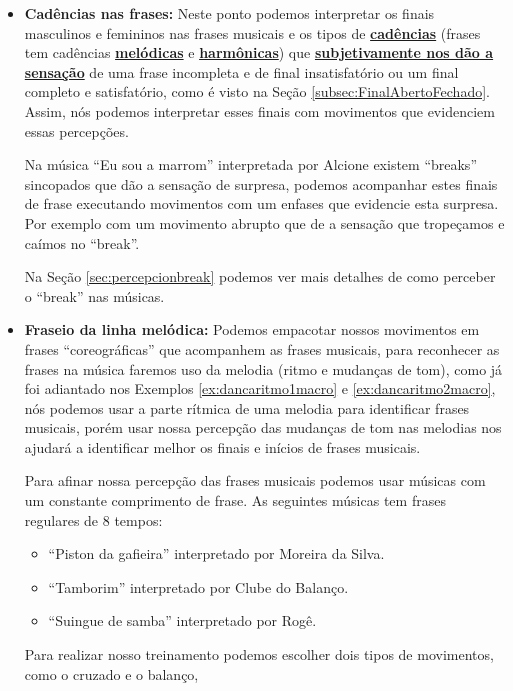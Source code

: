 \begin{itemize}
\begin{example}
\end{example}  
\item \textbf{Cadências nas frases:} Neste ponto podemos interpretar
os finais masculinos e femininos nas frases musicais  e  
os tipos de \hyperref[sec:Cadencia]{\textbf{cadências}}
(frases tem cadências 
\hyperref[subsec:cadenciamelodica]{\textbf{melódicas}} e 
\hyperref[sec:CadenciaHarmonica]{\textbf{harmônicas}})   
que \hyperref[subsec:FinalAbertoFechado]{\textbf{subjetivamente nos dão a sensação}} 
de uma frase incompleta e de final insatisfatório ou um final completo e satisfatório, como é visto na Seção \ref{subsec:FinalAbertoFechado}.
Assim, nós podemos interpretar esses finais com movimentos que evidenciem 
essas percepções.
\begin{example}
Na música ``Eu sou a marrom'' interpretada por Alcione existem ``breaks'' sincopados
que dão a sensação de surpresa, podemos acompanhar estes finais de frase executando movimentos 
com um enfases que evidencie esta surpresa. Por exemplo com um movimento abrupto 
que de a sensação que tropeçamos e caímos no ``break''. 
\end{example}  
Na Seção \ref{sec:percepcionbreak} podemos ver mais detalhes de como perceber o ``break'' nas músicas.
\item \textbf{Fraseio da linha melódica:} Podemos empacotar nossos movimentos em frases ``coreográficas''
que acompanhem as frases musicais, para reconhecer as frases na música faremos uso da melodia (ritmo e mudanças de tom),
como já foi adiantado nos Exemplos \ref{ex:dancaritmo1macro} e \ref{ex:dancaritmo2macro},
nós podemos usar a parte rítmica de uma melodia para identificar frases musicais,
porém usar nossa percepção das mudanças de tom nas melodias nos ajudará a identificar melhor 
os finais e inícios de frases musicais.
\begin{example} Para afinar nossa percepção das frases musicais
podemos usar músicas com um constante comprimento de frase.
As seguintes músicas tem frases regulares de 8 tempos:
\begin{itemize}
\item ``Piston da gafieira'' interpretado por Moreira da Silva.
\item ``Tamborim'' interpretado por Clube do Balanço.
\item ``Suingue de samba'' interpretado por Rogê.
\end{itemize}
Para realizar nosso treinamento podemos escolher dois tipos de movimentos, como o cruzado e o balanço,

\end{example}
\end{itemize}
